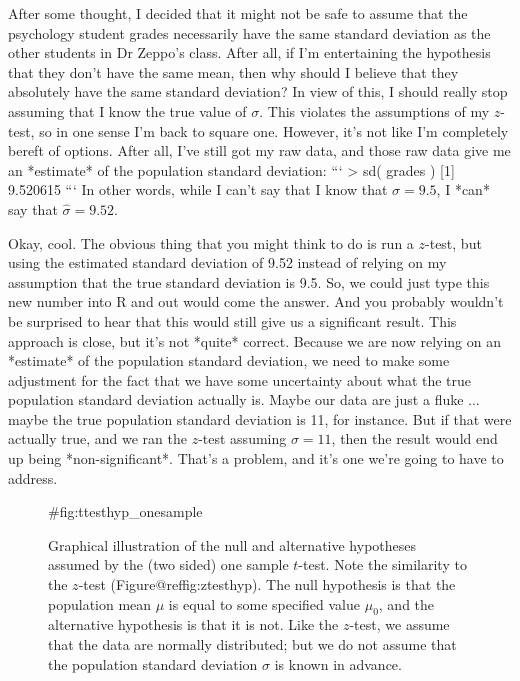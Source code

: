 After some thought, I decided that it might not be safe to assume that the psychology student grades necessarily have the same standard deviation as the other students in Dr Zeppo's class. After all, if I'm entertaining the hypothesis that they don't have the same mean, then why should I believe that they absolutely have the same standard deviation? In view of this, I should really stop assuming that I know the true value of $\sigma$. This violates the assumptions of my $z$-test, so in one sense I'm back to square one. However, it's not like I'm completely bereft of options. After all, I've still got my raw data, and those raw data give me an *estimate* of the population standard deviation: 
```
> sd( grades )
[1] 9.520615
```
In other words, while I can't say that I know that $\sigma = 9.5$, I *can* say that $\hat\sigma = 9.52$. 

Okay, cool. The obvious thing that you might think to do is run a $z$-test, but using the estimated standard deviation of 9.52 instead of relying on my assumption that the true standard deviation is 9.5. So, we could just type this new number into R and out would come the answer. And you probably wouldn't be surprised to hear that this would still give us a significant result. This approach is close, but it's not *quite* correct. Because we are now relying on an *estimate* of the population standard deviation, we need to make some adjustment for the fact that we have some uncertainty about what the true population standard deviation actually is. Maybe our data are just a fluke ... maybe the true population standard deviation is 11, for instance. But if that were actually true, and we ran the $z$-test assuming $\sigma=11$, then the result would end up being *non-significant*. That's a problem, and it's one we're going to have to address.


\begin{figure}
\begin{center}
\caption{Graphical illustration of the null and alternative hypotheses assumed by the (two sided) one sample $t$-test. Note the similarity to the $z$-test (Figure@reffig:ztesthyp). The null hypothesis is that the population mean $\mu$ is equal to some specified value $\mu_0$, and the alternative hypothesis is that it is not. Like the $z$-test, we assume that the data are normally distributed; but we do not assume that the population standard deviation $\sigma$ is known in advance.}
\HR
{#fig:ttesthyp_onesample}
\end{center}
\end{figure}


